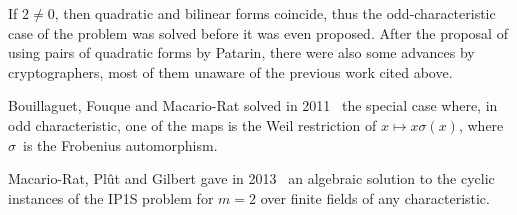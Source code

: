 \documentclass{amsart}
\def\F{\mathbb{F}}
\begin{document}
% 
If $2 ≠ 0$, then quadratic and bilinear forms coincide,
thus the odd-characteristic case of the problem
was solved before it was even proposed.
After the proposal of using pairs of quadratic forms by Patarin,
there were also some advances by cryptographers,
most of them unaware of the previous work cited above.

Bouillaguet, Fouque and Macario-Rat solved
in 2011~\cite{DBLP:conf/asiacrypt/BouillaguetFM11}
the special case where, in odd characteristic,
one of the maps is the Weil restriction of $x ↦ x σ(x)$,
where $σ$~is the Frobenius automorphism.

Macario-Rat, Plût and Gilbert gave in 2013~\cite{MPG2013}
an algebraic solution to the cyclic instances of the IP1S problem
for $m=2$ over finite fields of any characteristic.
\end{document}
